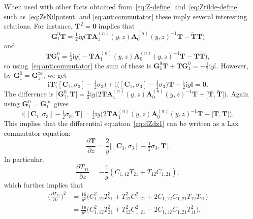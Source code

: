 \documentclass[11pt]{article}
\numberwithin{equation}{section}
\numberwithin{equation}{section}
\begin{document}
When used with other facts obtained from~\eqref{eq:Z-define} and~\eqref{eq:Ztilde-define} such as~\eqref{eq:ZsNilpotent} and \eqref{eq:anticommutator}
these imply several interesting relations. For instance, $\mathbf{T}^2=\mathbf{0}$ implies that
\begin{equation*}
\mathbf{G}_1^0\mathbf{T}=\tfrac{1}{2}\mathrm{i} y\bigl(\mathbf{T}\mathbf{A}_1^{(n)}(y,z)\mathbf{A}_0^{(n)}(y,z)^{-1}\mathbf{T}-\widetilde{\mathbf{T}}\mathbf{T}\bigr)
\end{equation*}
and
\begin{equation*}
\mathbf{T}\mathbf{G}_1^0=\tfrac{1}{2}\mathrm{i} y\bigl(-\mathbf{T}\mathbf{A}_1^{(n)}(y,z)\mathbf{A}_0^{(n)}(y,z)^{-1}\mathbf{T}-\mathbf{T}\widetilde{\mathbf{T}}\bigr),
\end{equation*}
so using~\eqref{eq:anticommutator} the sum of these is $\mathbf{G}_1^0\mathbf{T}+\mathbf{T}\mathbf{G}_1^0=-\tfrac{1}{2}\mathrm{i} y\mathbb{I}$. However, by $\mathbf{G}_1^0=\mathbf{G}_1^\infty$, we get
\begin{equation}
\mathrm{i}\mathbf{T}\bigl([\mathbf{C}_1,\sigma_3]-\tfrac{1}{2}\sigma_3\bigr)+\mathrm{i}\bigl([\mathbf{C}_1,\sigma_3]-\tfrac{1}{2}\sigma_3\bigr)\mathbf{T}+\tfrac{1}{2}\mathrm{i} y\mathbb{I}=\mathbf{0}.
\label{eq:one-identity}
\end{equation}
The difference is $\big[\mathbf{G}_1^0,\mathbf{T}\big] = \tfrac{1}{2}\mathrm{i} y\bigl(2\mathbf{T}\mathbf{A}_1^{(n)}(y,z)\mathbf{A}_0^{(n)}(y,z)^{-1}\mathbf{T}+\big[\mathbf{T},\widetilde{\mathbf{T}}\big]\bigr)$. Again using $\mathbf{G}_1^0=\mathbf{G}_1^\infty$ gives
\begin{equation*}
\mathrm{i}\big[[\mathbf{C}_1,\sigma_3]-\tfrac{1}{2}\sigma_3,\mathbf{T}\big]=\tfrac{1}{2}\mathrm{i} y\bigl(2\mathbf{T}\mathbf{A}_1^{(n)}(y,z)\mathbf{A}_0^{(n)}(y,z)^{-1}\mathbf{T}+\big[\mathbf{T},\widetilde{\mathbf{T}}\big]\bigr).
\end{equation*}
This implies that the differential equation~\eqref{eq:dZdz1} can be written as a Lax commutator equation:
\begin{equation*}
\frac{\partial\mathbf{T}}{\partial z}=\frac{2}{y}\big[[\mathbf{C}_1,\sigma_3]-\tfrac{1}{2}\sigma_3,\mathbf{T}\big].
\label{eq:dZdz2}
\end{equation*}
In particular,
\begin{equation*}
\frac{\partial T_{11}}{\partial z}=-\frac{4}{y}(C_{1,12}T_{21}+T_{12}C_{1,21}),
\label{eq:dZ11dz}
\end{equation*}
which further implies that
\begin{align}
\bigg(\frac{\partial T_{11}}{\partial z}\bigg)^2 &= \frac{16}{y^2}\bigl(C_{1,12}^2T_{21}^2 + T_{12}^2C_{1,21}^2 + 2C_{1,12}C_{1,21}T_{12}T_{21}\bigr) \nonumber\\
&=\frac{16}{y^2}\bigl(C_{1,12}^2T_{21}^2 + T_{12}^2C_{1,21}^2-2C_{1,12}C_{1,21}T_{11}^2\bigr),\label{eq:FirstOrderSecondDegree1}
\end{align}
\end{document}
